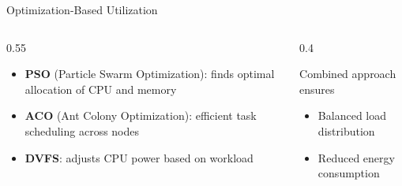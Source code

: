 \documentclass[aspectratio=169,11pt]{beamer}
\begin{document}
\begin{frame}{Optimization-Based Utilization}
  \begin{columns}[T]
    \begin{column}{0.55\textwidth}
      \begin{itemize}
        \item \textbf{PSO} (Particle Swarm Optimization): finds optimal allocation of CPU and memory
        \item \textbf{ACO} (Ant Colony Optimization): efficient task scheduling across nodes
        \item \textbf{DVFS}: adjusts CPU power based on workload
      \end{itemize}
    \end{column}
    \begin{column}{0.4\textwidth}
      \begin{block}{Combined approach ensures}
        \begin{itemize}
          \item Balanced load distribution
          \item Reduced energy consumption
        \end{itemize}
      \end{block}
    \end{column}
  \end{columns}
\end{frame}
\end{document}
